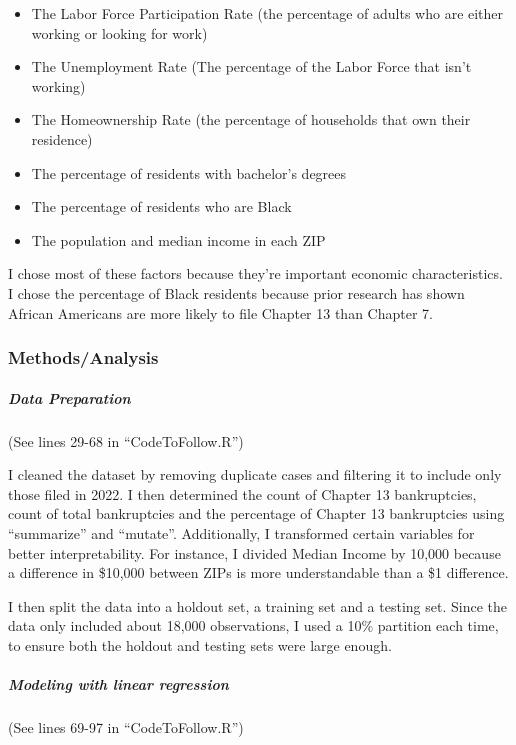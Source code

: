 \documentclass[
]{article}
\begin{document}
\begin{itemize}
\item
  The Labor Force Participation Rate (the percentage of adults who are
  either working or looking for work)
\item
  The Unemployment Rate (The percentage of the Labor Force that isn't
  working)
\item
  The Homeownership Rate (the percentage of households that own their
  residence)
\item
  The percentage of residents with bachelor's degrees
\item
  The percentage of residents who are Black
\item
  The population and median income in each ZIP
\end{itemize}

I chose most of these factors because they're important economic
characteristics. I chose the percentage of Black residents because prior
research has shown African Americans are more likely to file Chapter 13
than Chapter 7.

\hypertarget{methodsanalysis}{%
\subsubsection{Methods/Analysis}\label{methodsanalysis}}

\hypertarget{data-preparation}{%
\subparagraph{Data Preparation}\label{data-preparation}}

(See lines 29-68 in ``CodeToFollow.R'')

I cleaned the dataset by removing duplicate cases and filtering it to
include only those filed in 2022. I then determined the count of Chapter
13 bankruptcies, count of total bankruptcies and the percentage of
Chapter 13 bankruptcies using ``summarize'' and ``mutate''.
Additionally, I transformed certain variables for better
interpretability. For instance, I divided Median Income by 10,000
because a difference in \$10,000 between ZIPs is more understandable
than a \$1 difference.

I then split the data into a holdout set, a training set and a testing
set. Since the data only included about 18,000 observations, I used a
10\% partition each time, to ensure both the holdout and testing sets
were large enough.

\hypertarget{modeling-with-linear-regression}{%
\subparagraph{Modeling with linear
regression}\label{modeling-with-linear-regression}}

(See lines 69-97 in ``CodeToFollow.R'')
\end{document}
